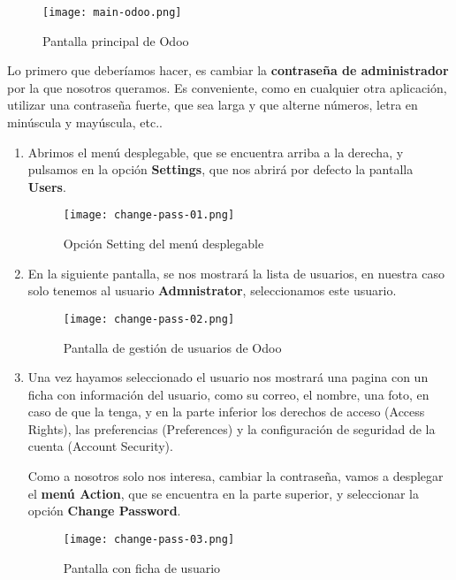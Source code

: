 \begin{figure}[ht]
    \centering
    \texttt{[image: main-odoo.png]}
    \caption{Pantalla principal de Odoo}
\end{figure}

Lo primero que deberíamos hacer, es cambiar la \textbf{contraseña de administrador} por la que nosotros queramos. Es conveniente, como en cualquier otra aplicación, utilizar una contraseña fuerte, que sea larga y que alterne números, letra en minúscula y mayúscula, etc..

\begin{enumerate}
    \item Abrimos el menú desplegable, que se encuentra arriba a la derecha, y pulsamos en la opción \textbf{Settings}, que nos abrirá por defecto la pantalla \textbf{Users}.

    \begin{figure}[ht]
        \centering
        \texttt{[image: change-pass-01.png]}
        \caption{Opción Setting del menú desplegable}
    \end{figure}

    \item En la siguiente pantalla, se nos mostrará la lista de usuarios, en nuestra caso solo tenemos al usuario \textbf{Admnistrator}, seleccionamos este usuario.

    \begin{figure}[ht]
        \centering
        \texttt{[image: change-pass-02.png]}
        \caption{Pantalla de gestión de usuarios de Odoo}
        \label{fig:user}
    \end{figure}

    \item Una vez hayamos seleccionado el usuario nos mostrará una pagina con un ficha con información del usuario, como su correo, el nombre, una foto, en caso de que la tenga, y en la parte inferior los derechos de acceso (Access Rights), las preferencias (Preferences) y la configuración de seguridad de la cuenta (Account Security).

    Como a nosotros solo nos interesa, cambiar la contraseña, vamos a desplegar el \textbf{menú Action}, que se encuentra en la parte superior, y seleccionar la opción \textbf{Change Password}.

    \vspace{8ex}

    \begin{figure}[ht]
        \centering
        \texttt{[image: change-pass-03.png]}
        \caption{Pantalla con ficha de usuario}
        \label{fig:card}
    \end{figure}


\end{enumerate}
